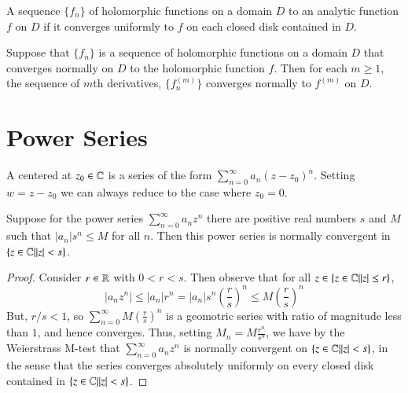 \documentclass[12pt, a4paper, oneside, openright, titlepage]{book}
\begin{document}
\begin{defn}
    A sequence $\{f_n\}$ of holomorphic functions on a domain $D$  to an analytic function $f$ on $D$ if it converges uniformly to $f$ on each closed disk contained in $D$.
\end{defn}


\begin{thm}
    Suppose that $\{f_n\}$ is a sequence of holomorphic functions on a domain $D$ that converges normally on $D$ to the holomorphic function $f$. Then for each $m \geq 1$, the sequence of $m$th derivatives, $\{f_n^{(m)}\}$ converges normally to $f^{(m)}$ on $D$.
\end{thm}





\section{Power Series}

\begin{defn}
    A  centered at $z_0 \in \mathbb C$ is a series of the form $\sum_{n=0}^{\infty}a_n(z-z_0)^n$. Setting $w = z-z_0$ we can always reduce to the case where $z_0 = 0$.
\end{defn}


\begin{namthm}
    Suppose for the power series $\sum_{n=0}^{\infty}a_nz^n$ there are positive real numbers $s$ and $M$ such that $|a_n|s^n \leq M$ for all $n$. Then this power series is normally convergent in $\{z \in \mathbb C\vert |z|<s\}$. 
\end{namthm}
\begin{proof}
    Consider $r \in \mathbb R$ with $0 < r < s$. Then observe that for all $z \in \{z\in\mathbb C\vert |z| \leq r\}$, \begin{equation*}
        |a_nz^n| \leq |a_n|r^n = |a_n|s^n\left(\frac{r}{s}\right)^n \leq M\left(\frac{r}{s}\right)^n
    \end{equation*}
    But, $r/s < 1$, so $\sum_{n=0}^{\infty}M\left(\frac{r}{s}\right)^n$ is a geomotric series with ratio of magnitude less than $1$, and hence converges. Thus, setting $M_n = M\frac{r^n}{s^n}$, we have by the Weierstrass M-test that $\sum_{n=0}^{\infty}a_nz^n$ is normally convergent on $\{z \in \mathbb C\vert|z| <s\}$, in the sense that the series converges absolutely uniformly on every closed disk contained in $\{z \in \mathbb C\vert|z| < s\}$.
\end{proof}
\end{document}
